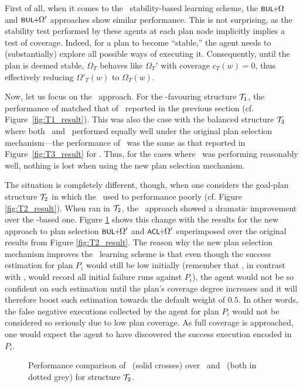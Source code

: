 First of all, when it comes to the \BUL\ stability-based learning scheme, the
 $\BULSELA$ and $\BULSELB$ approaches show similar performance.
This is not surprising, as the stability test performed by these agents at each
plan node implicitly implies a test of coverage. Indeed, for a plan to become
``stable,'' the agent needs to (substantially) explore all possible  ways of
executing it. Consequently,  until the plan is deemed stable, $\Omega_T$ behaves
like $\Omega_T'$ with coverage $c_T(w)=0$, thus effectively reducing
$\Omega'_T(w)$ to $\Omega_T(w)$.



Now, let us focus on the \CL\ approach.
For the \CL-favouring structure ${\mathcal{T}}_1$, the performance of \CLSELB matched that
of \CLSELA\ reported in the previous section (cf. Figure~\ref{fig:T1_result}).
This was also the case with the balanced structure ${\mathcal{T}}_3$ where both \CL\ and
\BUL\ performed equally well under the original plan selection mechanism---the
performance of \CLSELB\ was the same as that reported in
Figure~\ref{fig:T3_result} for \CLSELA.
Thus, for the cases where \CL\ was performing reasonably well, nothing is lost
when using the new plan selection mechanism.



The situation is completely different, though, when one considers the goal-plan
structure ${\mathcal{T}}_2$ in which the \CLSELA\ used to performance poorly (cf. Figure
\ref{fig:T2_result}).
When ran in ${\mathcal{T}}_2$, the \CLSELB\ approach showed a dramatic improvement over the
\CLSELA-based one. Figure \ref{fig:T2_result2} shows this change with the results
for the new approach to plan selection $\BULSELB$ and $\CLSELB$ superimposed over
the original results from Figure \ref{fig:T2_result}.
The reason why the new plan selection mechanism improves the \CL\ learning scheme
is that even though the success estimation for plan $P_i$ would still be low
initially (remember that \CL, in contrast with \BUL, would record all initial
failure runs against $P_i$), the agent would not be so confident on such
estimation until the plan's coverage degree increases and it will therefore boost
such estimation towards the default weight of $0.5$. In other words, the false
negative executions collected by the agent for plan $P_i$ would not be considered
so seriously due to low plan coverage. As full coverage is approached, one would
expect the agent to have discovered the success execution encoded in $P_i$.



\begin{figure}[t]
\begin{center}

\caption{Performance comparison of \CLSELB\ (solid crosses) over
\CLSELA\ and \BULSELA\ (both in dotted grey) for structure ${\mathcal{T}}_2$.}
\label{fig:T2_result2}
\end{center}
\end{figure}



